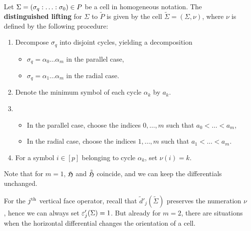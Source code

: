 \begin{defi}
   Let $\Sigma = \homogq \in P$ be a cell in homogeneous notation.
   The \textbf{distinguished lifting} for $\Sigma$ to $\tilde P$ is given by the cell $\tilde \Sigma = (\Sigma, \nu)$,
   where $\nu$ is defined by the following procedure:
   \begin{enumerate}
      \item Decompose $\sigma_q$ into disjoint cycles, yielding a decomposition
	 \begin{itemize}
	    \item $\sigma_q = \alpha_0 \dotsc \alpha_m$ in the parallel case,
	    \item $\sigma_q = \alpha_1 \dotsc \alpha_m$ in the radial case.
         \end{itemize} 
      \item Denote the minimum symbol of each cycle $\alpha_k$ by $a_k$.
      \item \begin{itemize}
               \item In the parallel case, choose the indices $0, \dotsc, m$ such that $a_0 < \dotsc < a_m$,
               \item In the radial case, choose the indices $1, \dotsc, m$ such that $a_1 < \dotsc < a_m$.
            \end{itemize}
      \item For a symbol $i \in [p]$ belonging to cycle $\alpha_k$, set $\nu(i) = k$. 
   \end{enumerate}
\end{defi}

Note that for $m = 1$, $\mathfrak H$ and $\tilde {\mathfrak H}$ coincide, and we can keep the differentials unchanged.

For the $j^{\text{th}}$ vertical face operator, recall that $\tilde d'_j(\tilde \Sigma)$ preserves the numeration $\nu$, 
hence we can always set $\varepsilon_j'(\Sigma) = 1$.
But already for $m = 2$, there are situations when the horizontal differential changes the orientation of a cell.

